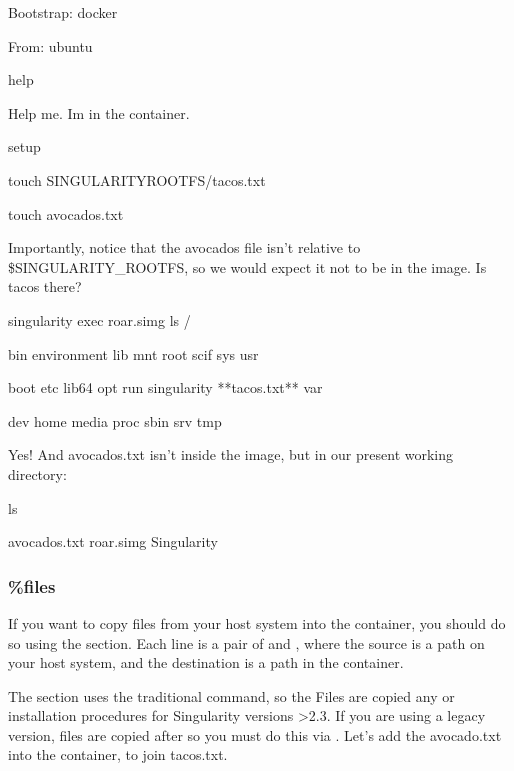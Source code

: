 \documentclass[letterpaper,10pt,english]{sphinxmanual}
\begin{document}
%
\begin{sphinxVerbatim}[commandchars=\\\{\}]
Bootstrap: docker

From: ubuntu


\PYGZpc{}help

Help me. I\PYGZsq{}m in the container.


\PYGZpc{}setup

    touch \PYGZdl{}\PYGZob{}SINGULARITY\PYGZus{}ROOTFS\PYGZcb{}/tacos.txt

    touch avocados.txt
\end{sphinxVerbatim}

Importantly, notice that the avocados file isn’t relative to
\$SINGULARITY\_ROOTFS, so we would expect it not to be in the image. Is
tacos there?

%
\begin{sphinxVerbatim}[commandchars=\\\{\}]
\PYGZdl{} singularity exec roar.simg ls /

bin   environment  lib    mnt   root  scif     sys        usr

boot  etc      lib64  opt   run   singularity  **tacos.txt**  var

dev   home     media  proc  sbin  srv      tmp
\end{sphinxVerbatim}

Yes! And avocados.txt isn’t inside the image, but in our present working
directory:

%
\begin{sphinxVerbatim}[commandchars=\\\{\}]
\PYGZdl{} ls

avocados.txt   roar.simg   Singularity
\end{sphinxVerbatim}


\subsubsection{\%files}
\label{\detokenize{container_recipes:files}}
If you want to copy files from your host system into the container,
you should do so using the  section. Each line is a pair of  and , where
the source is a path on your host system, and the destination is a
path in the container.

The  section uses the traditional  command, so the 
Files are copied  any  or installation procedures for
Singularity versions \textgreater{}2.3. If you are using a legacy version, files
are copied after  so you must do this via . Let’s add the avocado.txt
into the container, to join tacos.txt.
\end{document}
